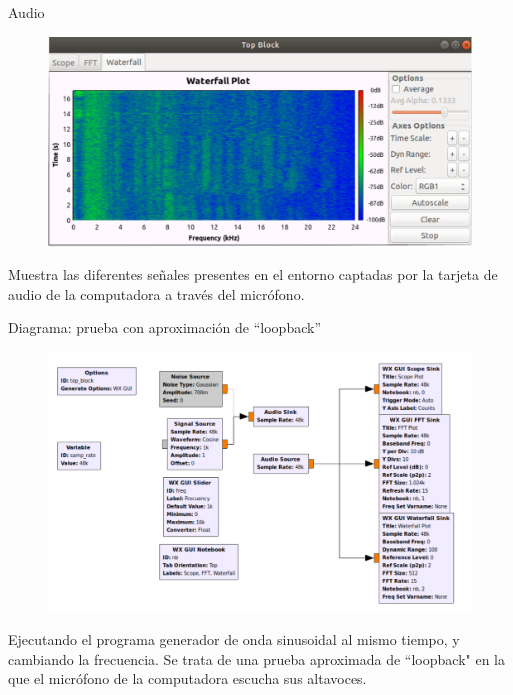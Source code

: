 \begin{frame}{Audio}

\begin{figure}
\begin{center}
\vspace{-8mm}
\includegraphics[width=\textwidth]{parte1/lab4/pdf/lab4_8.pdf}
\end{center}
\end{figure}

Muestra las diferentes señales presentes en el entorno captadas por la tarjeta de audio de la computadora a través del micrófono.

\end{frame}

\begin{frame}{Diagrama: prueba con aproximación de “loopback”}

\begin{figure}
\begin{center}
\vspace{-6mm}
\includegraphics[width=\textwidth, height=0.6\paperheight]{parte1/lab4/pdf/lab4_9.pdf}
\end{center}
\end{figure}
\vspace{-5mm}
Ejecutando el programa generador de onda sinusoidal al mismo tiempo, y cambiando la frecuencia. Se trata de una prueba aproximada de “loopback" en la que el micrófono de la computadora escucha sus altavoces.

\end{frame}

